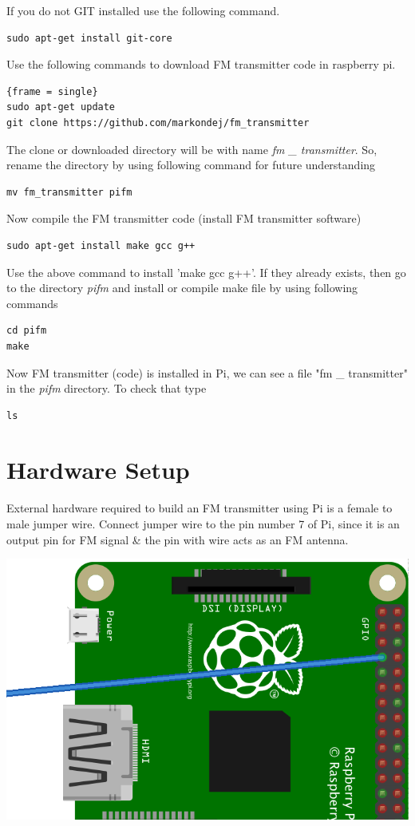 \documentclass[journal,12pt,twocolumn]{IEEEtran}
\begin{document}
If you do not GIT installed use the following command.
\begin{lstlisting}[frame = single]
 sudo apt-get install git-core
\end{lstlisting}
Use the following commands to download FM transmitter code in raspberry pi.
\begin{lstlisting}{frame = single}
sudo apt-get update
git clone https://github.com/markondej/fm_transmitter
\end{lstlisting}
The clone or downloaded directory will be with name \textit{fm \_ transmitter}. So, rename the directory by using following command for future understanding
\begin{lstlisting}
mv fm_transmitter pifm
\end{lstlisting} 
Now compile the FM transmitter code (install FM transmitter software)
\begin{lstlisting}
sudo apt-get install make gcc g++
\end{lstlisting}
Use the above command to install 'make gcc g++'. If they already exists, then go to the directory \textit{pifm} and install or compile make file by using following commands
\begin{lstlisting}
cd pifm
make
\end{lstlisting}
Now FM transmitter (code) is installed in Pi, we can see a file "fm \_ transmitter" in the  \textit{pifm} directory. To check that type
\begin{lstlisting}
ls
\end{lstlisting} 

\section{Hardware Setup}
External hardware required to build an FM transmitter using Pi is a female to male jumper wire. Connect jumper wire to the pin number 7 of Pi, since it is an output pin for FM signal \& the pin with wire acts as an FM antenna.   
\begin{center}
\includegraphics[scale=0.2]{Figures/pifm}
\end{center}
\end{document}
